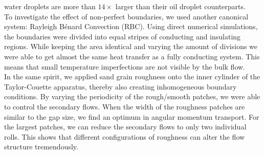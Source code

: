 water droplets are more than $14\times$ larger than their oil droplet
counterparts.\\
\indent To investigate the effect of non-perfect boundaries, we used another
canonical system: Rayleigh B\'enard Convection (RBC).
Using direct numerical
simulations, the boundaries were divided into equal stripes of conducting
and insulating regions.
While keeping the area identical and varying the amount
of divisions we were able to get almost the same heat transfer as a fully
conducting system. This means that small temperature imperfections are not
visible by the bulk flow.\\
\indent In the same spirit, we applied sand grain roughness onto the inner cylinder of
the Taylor-Couette apparatus, thereby also creating inhomogeneous boundary
conditions. By varying the periodicity of the rough/smooth patches, we were
able to control the secondary flows.
When the width of the roughness patches are similar to the gap size, we find
an optimum in angular momentum transport.
For the largest patches, we can reduce the secondary flows to only two
individual rolls.
This shows that different configurations of roughness can alter the flow
structure tremendously.

